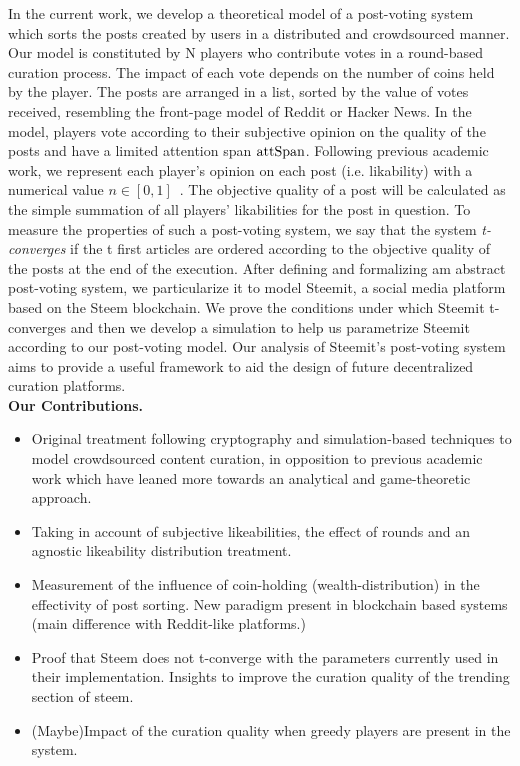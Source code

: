  In the current work, we develop a theoretical model of a post-voting system which sorts the posts created by users in a distributed and crowdsourced manner.
  Our model is constituted by N players who contribute votes in a round-based curation process. The impact of each vote depends on the number of coins held by the player.
   The posts are arranged in a list, sorted by the value of votes received, resembling the front-page model of Reddit or Hacker News. In the model, players vote according to their subjective opinion on the quality of the posts and have a limited attention span $\mathrm{attSpan}$.
   Following previous academic work, we represent each player's opinion on each post (i.e. likability) with a numerical value $n \in [ 0,1 ]$~\cite{ghosh2011incentivizing,askalidis2013theoretical}.
   The objective quality of a post will be calculated as the simple summation of all players' likabilities for the post in question. To measure the properties of such a post-voting system, we say that the system \textit{t-converges} if the t first articles are ordered according to the objective quality of the posts at the end of the execution.
  After defining and formalizing am abstract post-voting system, we particularize it to model Steemit, a social media platform based on the Steem blockchain.
   We prove the conditions under which Steemit t-converges and then we develop a simulation to help us parametrize Steemit according to our post-voting model.
   Our analysis of Steemit's post-voting system aims to provide a useful framework to aid the design of future decentralized curation platforms.\\

  \textbf{Our Contributions.}
  \begin{itemize}
  \item Original treatment following cryptography and simulation-based techniques to model crowdsourced content curation, in opposition to previous academic work which have leaned more towards an analytical and game-theoretic approach.

  \item Taking in account of subjective likeabilities, the effect of rounds and an agnostic likeability distribution treatment.

  \item Measurement of the influence of coin-holding (wealth-distribution) in the effectivity of post sorting. New paradigm present in blockchain based systems (main difference with Reddit-like platforms.)

  \item Proof that Steem does not t-converge with the parameters currently used in their implementation. Insights to improve the curation quality of the trending section of steem.

  \item (Maybe)Impact of the curation quality when greedy players are present in the system.
  \end{itemize}
